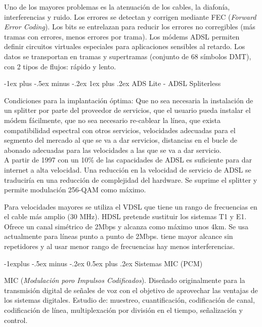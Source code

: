 \documentclass[10pt,portrait, twocolumn]{article}
\makeatletter
\renewcommand{\subsection}{\@startsection{subsection}{2}{0mm}%
                                {-1explus -.5ex minus -.2ex}%
                                {0.5ex plus .2ex}%
                                {\normalfont\normalsize\bfseries}}
\renewcommand{\subsubsection}{\@startsection{subsubsection}{3}{0mm}%
                                {-1ex plus -.5ex minus -.2ex}%
                                {1ex plus .2ex}%
                                {\normalfont\small\bfseries}}
\makeatother
\begin{document}
Uno de los mayores problemas es la atenuación de los cables, la diafonía, interferencias y ruido. Los errores se detectan y corrigen mediante FEC (\textit{Forward Error Coding}). Los bits se entrelazan para reducir los errores no corregibles (más tramas con errores, menos errores por trama). Los módems ADSL permiten definir circuitos virtuales especiales para aplicaciones sensibles al retardo. Los datos se transportan en tramas y supertramas (conjunto de 68 símbolos DMT), con 2 tipos de flujos: rápido y lento.

\subsubsection{ADS Lite - ADSL Spliterless}

Condiciones para la implantación óptima: Que no sea necesaria la instalación de un splitter por parte del proveedor de servicios, que el usuario pueda instalar el módem fácilmente, que no sea necesario re-cablear la línea, que exista compatibilidad espectral con otros servicios, velocidades adecuadas para el segmento del mercado al que se va a dar servicios, distancias en el bucle de abonado adecuadas para las velocidades a las que se va a dar servicio.\\

A partir de 1997 con un 10\% de las capacidades de ADSL es suficiente para dar internet a alta velocidad. Una reducción en la velocidad de servicio de ADSL se traduciría en una reducción de complejidad del hardware. Se suprime el splitter y permite modulación 256-QAM como máximo.

Para velocidades mayores se utiliza el VDSL que tiene un rango de frecuencias en el cable más amplio (30 MHz). HDSL pretende sustituir los sistemas T1 y E1. Ofrece un canal simétrico de 2Mbps y alcanza como máximo unos 4km. Se usa actualmente para líneas punto a punto de 2Mbps. tiene mayor alcance sin repetidores y al usar menor rango de frecuencias hay menos interferencias.

\hrulefill

\subsection{Sistemas MIC (PCM)}

MIC (\textit{Modulación poro Impulsos Codificados}). Diseñado originalmente para la transmisión digital de señales de voz con el objetivo de aprovechar las ventajas de los sistemas digitales. Estudio de: muestreo, cuantificación, codificación de canal, codificación de línea, multiplexación por división en el tiempo, señalización y control.
\end{document}
